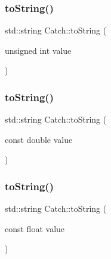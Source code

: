 \hypertarget{namespace_catch_a6fd78030f740c1c3bdc60efdfd5fc85d}{}\label{namespace_catch_a6fd78030f740c1c3bdc60efdfd5fc85d} 
\subsubsection{\texorpdfstring{to\+String()}{toString()}\hspace{0.1cm}{\footnotesize\ttfamily [10/17]}}
{\footnotesize\ttfamily std\+::string Catch\+::to\+String (\begin{DoxyParamCaption}\item[{unsigned int}]{value }\end{DoxyParamCaption})}

\hypertarget{namespace_catch_a3eb4356d09b7ef3286f6c1c1efe8cabf}{}\label{namespace_catch_a3eb4356d09b7ef3286f6c1c1efe8cabf} 
\subsubsection{\texorpdfstring{to\+String()}{toString()}\hspace{0.1cm}{\footnotesize\ttfamily [11/17]}}
{\footnotesize\ttfamily std\+::string Catch\+::to\+String (\begin{DoxyParamCaption}\item[{const double}]{value }\end{DoxyParamCaption})}

\hypertarget{namespace_catch_a80b6411e2cba89e58aa8feb960d045d5}{}\label{namespace_catch_a80b6411e2cba89e58aa8feb960d045d5} 
\subsubsection{\texorpdfstring{to\+String()}{toString()}\hspace{0.1cm}{\footnotesize\ttfamily [12/17]}}
{\footnotesize\ttfamily std\+::string Catch\+::to\+String (\begin{DoxyParamCaption}\item[{const float}]{value }\end{DoxyParamCaption})}

\hypertarget{namespace_catch_a5d3bdb2ec0e6f415e2a1a0e4914d7d3a}{}\label{namespace_catch_a5d3bdb2ec0e6f415e2a1a0e4914d7d3a} 
